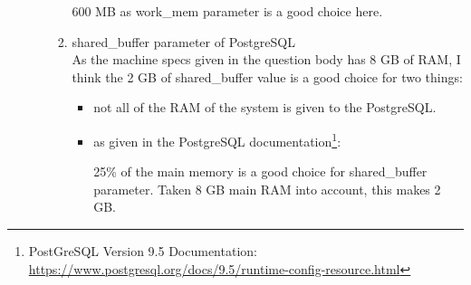 \documentclass[10pt]{article}
\begin{document}
\begin{enumerate}
\begin{itemize}
\begin{enumerate}[1.]
					\begin{table}[H]
						\bigskip
					\end{table}
					
					600 MB as work\_mem parameter is a good choice here.
					
					\bigskip
					
				\item shared\_buffer parameter of PostgreSQL\\
				
					As the machine specs given in the question body has 8 GB of RAM, I think the 2 GB of shared\_buffer value is a good choice for two things:
						
						\begin{itemize}[*]
							\item not all of the RAM of the system is given to the PostgreSQL.
							
							\item as given in the PostgreSQL documentation\footnote{PostGreSQL Version 9.5 Documentation: \url{https://www.postgresql.org/docs/9.5/runtime-config-resource.html}}:
							
							25\% of the main memory is a good choice for shared\_buffer parameter. Taken 8 GB main RAM into account, this makes 2 GB.
							

\end{itemize}
\end{enumerate}
\end{itemize}
\end{enumerate}
\end{document}
